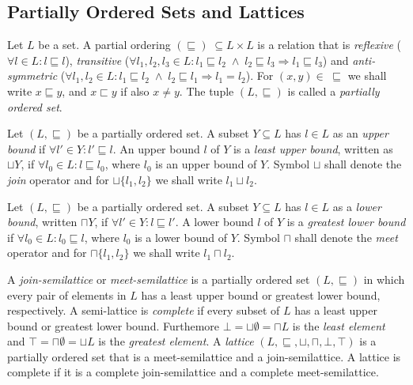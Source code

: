 \subsection{Partially Ordered Sets and Lattices}
\begin{defn}
Let $L$ be a set. A partial ordering $(\sqsubseteq) \; \subseteq L \times L$ is a relation that is \emph{reflexive} ($\forall l \in L: l \sqsubseteq l$), \emph{transitive} ($\forall l_1, l_2, l_3 \in L: l_1 \sqsubseteq l_2 \; \wedge \; l_2 \sqsubseteq l_3 \Rightarrow l_1 \sqsubseteq l_3$) and \emph{anti-symmetric} ($\forall l_1, l_2 \in L: l_1 \sqsubseteq l_2 \; \wedge \; l_2 \sqsubseteq l_1 \Rightarrow l_1 = l_2$). For $(x,y) \in \; \sqsubseteq$ we shall write $x \sqsubseteq y$, and $x \sqsubset y$ if also $x \neq y$. The tuple $(L, \sqsubseteq)$ is called a \emph{partially ordered set}.
\end{defn}

\begin{defn}
Let $(L, \sqsubseteq)$ be a partially ordered set. A subset $Y \subseteq L$ has $l \in L$ as an \emph{upper bound} if $\forall l' \in Y: l' \sqsubseteq l$. An upper bound $l$ of $Y$ is a \emph{least upper bound}, written as $\sqcup Y$, if $\forall l_0 \in L: l \sqsubseteq l_0$, where $l_0$ is an upper bound of $Y$. Symbol $\sqcup$ shall denote the \emph{join} operator and for $\sqcup\{l_1, l_2\}$ we shall write $l_1 \sqcup l_2$.
\end{defn}

\begin{defn}
Let $(L, \sqsubseteq)$ be a partially ordered set. A subset $Y \subseteq L$ has $l \in L$ as a \emph{lower bound}, written $\sqcap Y$, if $\forall l' \in Y: l \sqsubseteq l'$. A lower bound $l$ of $Y$ is a \emph{greatest lower bound} if $\forall l_0 \in L: l_0 \sqsubseteq l$, where $l_0$ is a lower bound of $Y$. Symbol $\sqcap$ shall denote the \emph{meet} operator and for $\sqcap\{l_1, l_2\}$ we shall write $l_1 \sqcap l_2$.
\end{defn}

\begin{defn}
A \emph{join-semilattice} or \emph{meet-semilattice} is a partially ordered set $(L, \sqsubseteq)$ in which every pair of elements in $L$ has a least upper bound or greatest lower bound, respectively. A semi-lattice is \emph{complete} if every subset of $L$ has a least upper bound or greatest lower bound. Furthemore $\bot = \sqcup \emptyset = \sqcap L$ is the \emph{least element} and $\top = \sqcap \emptyset = \sqcup L$ is the \emph{greatest element}. A \emph{lattice} $(L, \sqsubseteq, \sqcup, \sqcap, \bot, \top)$ is a partially ordered set that is a meet-semilattice and a join-semilattice. A lattice is complete if it is a complete join-semilattice and a complete meet-semilattice.
\end{defn}

